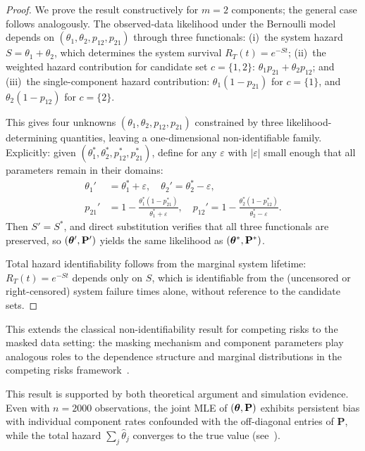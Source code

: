 \begin{proof}
We prove the result constructively for $m = 2$ components; the general case
follows analogously. The observed-data likelihood under the Bernoulli model
depends on $(\theta_1, \theta_2, p_{12}, p_{21})$ through three functionals:
(i)~the system hazard $S = \theta_1 + \theta_2$, which determines the system
survival $R_T(t) = e^{-St}$; (ii)~the weighted hazard contribution for
candidate set $c = \{1,2\}$: $\theta_1 p_{21} + \theta_2 p_{12}$; and
(iii)~the single-component hazard contribution: $\theta_1(1 - p_{21})$ for
$c = \{1\}$, and $\theta_2(1 - p_{12})$ for $c = \{2\}$.

This gives four unknowns $(\theta_1, \theta_2, p_{12}, p_{21})$ constrained by
three likelihood-determining quantities, leaving a one-dimensional
non-identifiable family. Explicitly: given $(\theta_1^*, \theta_2^*, p_{12}^*,
p_{21}^*)$, define for any $\varepsilon$ with $|\varepsilon|$ small enough
that all parameters remain in their domains:
\begin{align}
    \theta_1' &= \theta_1^* + \varepsilon, \quad
    \theta_2' = \theta_2^* - \varepsilon, \\
    p_{21}' &= 1 - \frac{\theta_1^*(1 - p_{21}^*)}{\theta_1^* + \varepsilon},
    \quad
    p_{12}' = 1 - \frac{\theta_2^*(1 - p_{12}^*)}{\theta_2^* - \varepsilon}.
\end{align}
Then $S' = S^*$, and direct substitution verifies that all three functionals
are preserved, so $(\bm{\theta}', \mathbf{P}')$ yields the same likelihood as
$(\bm{\theta}^*, \mathbf{P}^*)$.

Total hazard identifiability follows from the marginal system lifetime:
$R_T(t) = e^{-St}$ depends only on $S$, which is identifiable from the
(uncensored or right-censored) system failure times alone, without reference to
the candidate sets.
\end{proof}

This extends the classical non-identifiability result for competing risks
\citep{tsiatis1975nonidentifiability, crowder2001classical} to the masked data
setting: the masking mechanism and component parameters play analogous roles to
the dependence structure and marginal distributions in the competing risks
framework~\citep{manski2003partial}.

This result is supported by both theoretical argument and simulation evidence.
Even with $n = 2000$ observations, the joint MLE of $(\bm{\theta}, \mathbf{P})$
exhibits persistent bias with individual component rates confounded with the
off-diagonal entries of $\mathbf{P}$, while the total hazard
$\sum_j \hat\theta_j$ converges to the true value
(see~).

